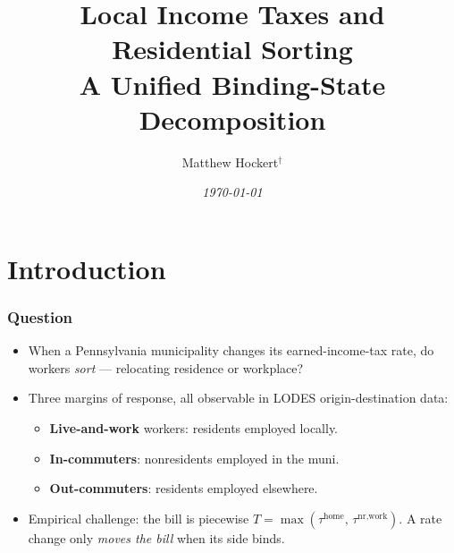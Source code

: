 \documentclass[xcolor = x11names, compress, aspectratio = 169]{beamer}
\begin{document}

\begin{frame}
    \title{Local Income Taxes and Residential Sorting \\
    \large A Unified Binding-State Decomposition}
    \author[Hockert]{
        Matthew Hockert$^\dagger$
    }
    \date{
        \small{\textit{\today}}
    }
    \titlepage
\end{frame}

\section{Introduction}

    \begin{frame}
    \frametitle{Question}
        \begin{itemize}\setlength{\itemsep}{0.15cm}
            \item When a Pennsylvania municipality changes its
            earned-income-tax rate, do workers \emph{sort} ---
            relocating residence or workplace?
            \item Three margins of response, all observable in LODES
            origin-destination data:
            \begin{itemize}\setlength{\itemsep}{0.05cm}
                \item \textbf{Live-and-work} workers: residents employed locally.
                \item \textbf{In-commuters}: nonresidents employed in the muni.
                \item \textbf{Out-commuters}: residents employed elsewhere.
            \end{itemize}
            \item Empirical challenge: the bill is piecewise
            $T = \max(\tau^{\text{home}},\, \tau^{\text{nr,work}})$.
            A rate change only \emph{moves the bill} when its side binds.
        \end{itemize}
    \end{frame}
\end{document}
